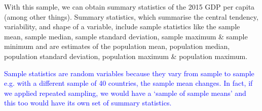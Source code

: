 \documentclass[12pt]{report}
\newenvironment{blueframed}[1][blue]
{\def\FrameCommand{\fboxsep=\FrameSep\fcolorbox{#1}{white}}%
\MakeFramed {\advance\hsize-\width \FrameRestore}}
{\endMakeFramed}
\begin{document}
\begin{blueframed}
{\begin{figure}[H]
	\end{figure}
\vspace{-\baselineskip} \noindent With this sample, we can obtain summary statistics of the 2015 GDP per capita (among other things). Summary statistics, which summarise the central tendency, variability, and shape of a variable, include sample statistics like the sample mean, sample median, sample standard deviation, sample maximum \& sample minimum and are estimates of the population mean, population median, population standard deviation, population maximum \& population maximum.}
\end{blueframed}
\begin{blueframed} \noindent \textcolor{blue}{\noindent Sample statistics are random variables because they vary from sample to sample e.g. with a different sample of 40 countries, the sample mean changes. In fact, if we applied repeated sampling, we would have a `sample of sample means' and this too would have its own set of summary statistics.}
\end{blueframed}

\end{document}
